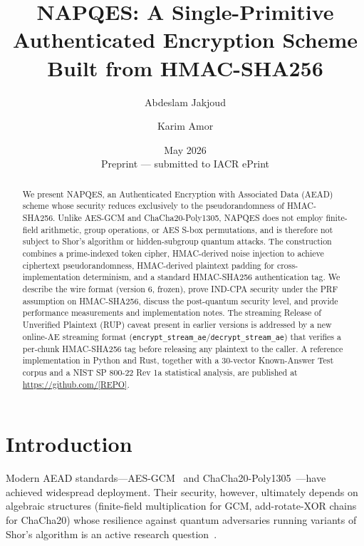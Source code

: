 \documentclass[11pt,a4paper]{article}
\title{\textbf{NAPQES: A Single-Primitive Authenticated Encryption Scheme\\
Built from HMAC-SHA256}}
\author[1]{Abdeslam Jakjoud}
\author[1]{Karim Amor}
\affil[1]{QAegis, France}
\date{May 2026 \\ \small{Preprint — submitted to IACR ePrint}}
\begin{document}
\maketitle

\begin{abstract}
We present NAPQES, an Authenticated Encryption with Associated Data (AEAD)
scheme whose security reduces exclusively to the pseudorandomness of
HMAC-SHA256.  Unlike AES-GCM and ChaCha20-Poly1305, NAPQES does not employ
finite-field arithmetic, group operations, or AES S-box permutations, and is
therefore not subject to Shor's algorithm or hidden-subgroup quantum attacks.
The construction combines a prime-indexed token cipher, HMAC-derived noise
injection to achieve ciphertext pseudorandomness, HMAC-derived plaintext
padding for cross-implementation determinism, and a standard HMAC-SHA256
authentication tag.  We describe the wire format (version 6, frozen), prove
IND-CPA security under the PRF assumption on HMAC-SHA256, discuss the
post-quantum security level, and provide performance measurements and
implementation notes.  The streaming Release of Unverified Plaintext (RUP) caveat present in
earlier versions is addressed by a new online-AE streaming format
(\texttt{encrypt\_stream\_ae}/\texttt{decrypt\_stream\_ae}) that verifies a
per-chunk HMAC-SHA256 tag before releasing any plaintext to the caller.
  A reference implementation in Python and Rust, together
with a 30-vector Known-Answer Test corpus and a NIST SP 800-22 Rev 1a
statistical analysis, are published at \url{https://github.com/[REPO]}.
\end{abstract}

\tableofcontents
\clearpage

\section{Introduction}
\label{sec:intro}

Modern AEAD standards—AES-GCM~\cite{nist-gcm} and
ChaCha20-Poly1305~\cite{rfc7539}—have achieved widespread deployment.
Their security, however, ultimately depends on algebraic structures
(finite-field multiplication for GCM, add-rotate-XOR chains for ChaCha20)
whose resilience against quantum adversaries running variants of Shor's
algorithm is an active research question~\cite{nistpq2022}.
\end{document}
